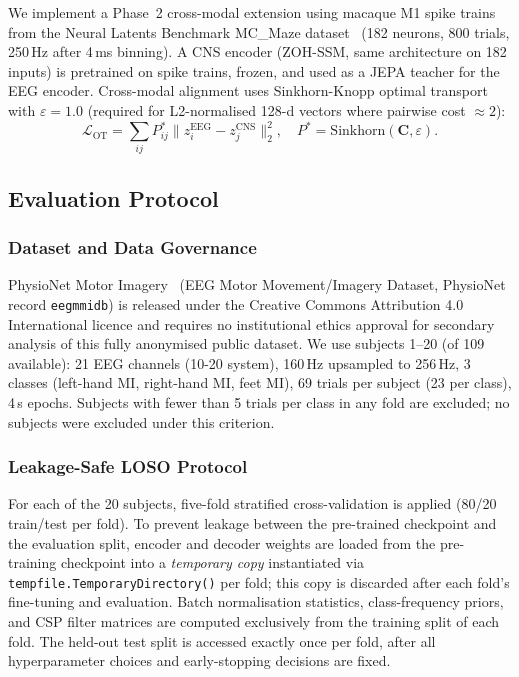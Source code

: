 \documentclass[journal]{IEEEtran}
\begin{document}
We implement a Phase~2 cross-modal extension using macaque M1 spike trains from the Neural Latents Benchmark MC\_Maze dataset~\cite{pei2021nlb} (182 neurons, 800 trials, 250\,Hz after 4\,ms binning).
A CNS encoder (ZOH-SSM, same architecture on 182 inputs) is pretrained on spike trains, frozen, and used as a JEPA teacher for the EEG encoder.
Cross-modal alignment uses Sinkhorn-Knopp optimal transport~\cite{cuturi2013sinkhorn} with $\varepsilon=1.0$ (required for L2-normalised 128-d vectors where pairwise cost $\approx 2$):
\begin{equation}
  \mathcal{L}_\text{OT} = \sum_{ij} P^*_{ij} \|z^\text{EEG}_i - z^\text{CNS}_j\|_2^2, \quad P^* = \text{Sinkhorn}(\mathbf{C}, \varepsilon).
\end{equation}

\subsection{Evaluation Protocol}
\label{sec:baselines}
\label{sec:protocol}

\subsubsection{Dataset and Data Governance}
PhysioNet Motor Imagery~\cite{schalk2004bci2000} (EEG Motor Movement/Imagery Dataset, PhysioNet record \texttt{eegmmidb}) is released under the Creative Commons Attribution 4.0 International licence and requires no institutional ethics approval for secondary analysis of this fully anonymised public dataset.
We use subjects 1--20 (of 109 available): 21 EEG channels (10-20 system), 160\,Hz upsampled to 256\,Hz, 3 classes (left-hand MI, right-hand MI, feet MI), 69 trials per subject (23 per class), 4\,s epochs.
Subjects with fewer than 5 trials per class in any fold are excluded; no subjects were excluded under this criterion.

\subsubsection{Leakage-Safe LOSO Protocol}
For each of the 20 subjects, five-fold stratified cross-validation is applied (80/20 train/test per fold).
To prevent leakage between the pre-trained checkpoint and the evaluation split, encoder and decoder weights are loaded from the pre-training checkpoint into a \emph{temporary copy} instantiated via \texttt{tempfile.TemporaryDirectory()} per fold; this copy is discarded after each fold's fine-tuning and evaluation.
Batch normalisation statistics, class-frequency priors, and CSP filter matrices are computed exclusively from the training split of each fold.
The held-out test split is accessed exactly once per fold, after all hyperparameter choices and early-stopping decisions are fixed.
\end{document}
